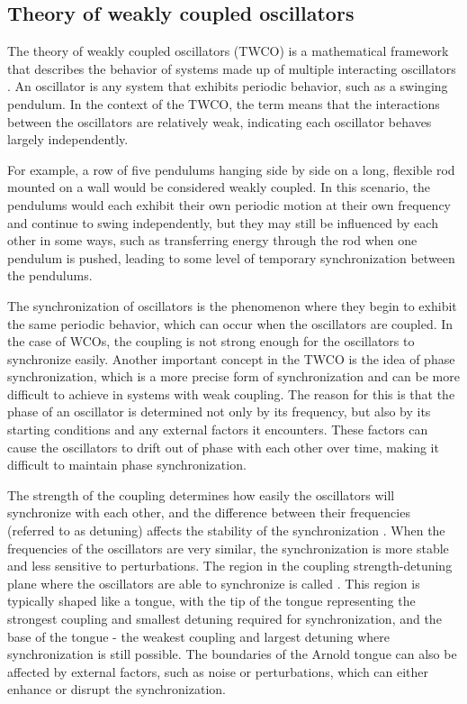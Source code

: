\subsection{Theory of weakly coupled oscillators}
\label{sec:twco}

The theory of weakly coupled oscillators (TWCO) is a mathematical framework that describes the behavior of systems made up of multiple interacting oscillators \cite{SchultheissBook2011:1}. An oscillator is any system that exhibits periodic behavior, such as a swinging pendulum. In the context of the TWCO, the term  means that the interactions between the oscillators are relatively weak, indicating each oscillator behaves largely independently.

For example, a row of five pendulums hanging side by side on a long, flexible rod mounted on a wall would be considered weakly coupled. In this scenario, the pendulums would each exhibit their own periodic motion at their own frequency and continue to swing independently, but they may still be influenced by each other in some ways, such as transferring energy through the rod when one pendulum is pushed, leading to some level of temporary synchronization between the pendulums.

The synchronization of oscillators is the phenomenon where they begin to exhibit the same periodic behavior, which can occur when the oscillators are coupled. In the case of WCOs, the coupling is not strong enough for the oscillators to synchronize easily. Another important concept in the TWCO is the idea of phase synchronization, which is a more precise form of synchronization and can be more difficult to achieve in systems with weak coupling. The reason for this is that the phase of an oscillator is determined not only by its frequency, but also by its starting conditions and any external factors it encounters. These factors can cause the oscillators to drift out of phase with each other over time, making it difficult to maintain phase synchronization.

The strength of the coupling determines how easily the oscillators will synchronize with each other, and the difference between their frequencies (referred to as detuning) affects the stability of the synchronization \cite{Pikovsky2002, Tiesinga2010, Lowet2015}. When the frequencies of the oscillators are very similar, the synchronization is more stable and less sensitive to perturbations. The region in the coupling strength-detuning plane where the oscillators are able to synchronize is called . This region is typically shaped like a tongue, with the tip of the tongue representing the strongest coupling and smallest detuning required for synchronization, and the base of the tongue - the weakest coupling and largest detuning where synchronization is still possible. The boundaries of the Arnold tongue can also be affected by external factors, such as noise or perturbations, which can either enhance or disrupt the synchronization.

